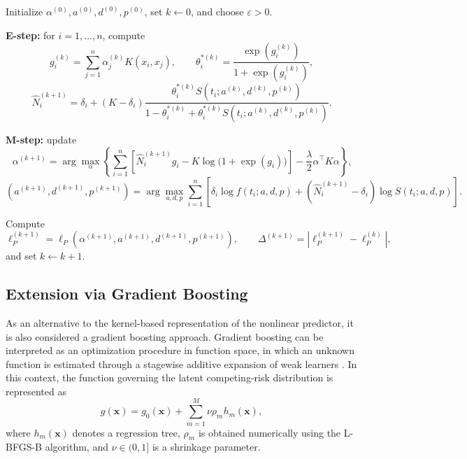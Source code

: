 \begin{algorithm}[H]
\caption{Penalized EM algorithm for the GG-KM model -
$N_i \sim \mathrm{Binomial}(K,\theta_i^*)$.}
\begin{algorithmic}[1]

\State Initialize
$\alpha^{(0)},a^{(0)},d^{(0)},p^{(0)}$, set $k\gets0$, and choose
$\varepsilon>0$.

\Repeat

\State \textbf{E-step:} for $i=1,\ldots,n$, compute
\[
g_i^{(k)}
=
\sum_{j=1}^{n}\alpha_j^{(k)}K(x_i,x_j),
\qquad
\theta_i^{*(k)}
=
\frac{\exp(g_i^{(k)})}{1+\exp(g_i^{(k)})},
\]
\[
\widehat N_i^{(k+1)}
=
\delta_i+
(K-\delta_i)
\frac{
\theta_i^{*(k)}
S(t_i;a^{(k)},d^{(k)},p^{(k)})
}{
1-\theta_i^{*(k)}
+\theta_i^{*(k)}
S(t_i;a^{(k)},d^{(k)},p^{(k)})
}.
\]

\State \textbf{M-step:} update
\[
\alpha^{(k+1)}
=
\arg\max_{\alpha}
\left\{
\sum_{i=1}^{n}
\left[
\widehat N_i^{(k+1)}g_i
-
K\log\!\bigl(1+\exp(g_i)\bigr)
\right]
-\frac{\lambda}{2}\alpha^\top K\alpha
\right\}\text{,}
\]
\[
(a^{(k+1)},d^{(k+1)},p^{(k+1)})
=
\arg\max_{a,d,p}
\sum_{i=1}^{n}
\left[
\delta_i\log f(t_i;a,d,p)
+
(\widehat N_i^{(k+1)}-\delta_i)
\log S(t_i;a,d,p)
\right].
\]

\State Compute
\[
\ell_P^{(k+1)}
=
\ell_P\!\left(
\alpha^{(k+1)},a^{(k+1)},d^{(k+1)},p^{(k+1)}
\right),
\qquad
\Delta^{(k+1)}
=
\left|\ell_P^{(k+1)}-\ell_P^{(k)}\right|,
\]
and set $k\gets k+1$.


\end{algorithmic}
\end{algorithm}

\subsection{Extension via Gradient Boosting}

As an alternative to the kernel-based representation of the nonlinear predictor,
it is also considered a gradient boosting approach. Gradient boosting can be
interpreted as an optimization procedure in function space, in which an unknown
function is estimated through a stagewise additive expansion of weak learners
\cite{friedman2001greedy,mason1999boosting}. In this context, the
function governing the latent competing-risk distribution is represented as
\begin{equation}
g(\mathbf{x})
=
g_0(\mathbf{x})
+
\sum_{m=1}^{M}
\nu \rho_m h_m(\mathbf{x}),
\end{equation}
where $h_m(\mathbf{x})$ denotes a regression tree, $\rho_m$ is obtained numerically
using the L-BFGS-B algorithm, and $\nu\in(0,1]$ is a shrinkage parameter.

